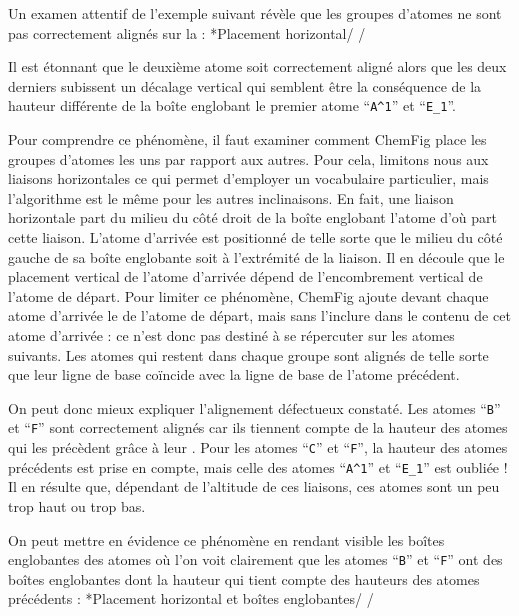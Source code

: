 \documentclass[10pt]{article}
\makeatletter
\newcommand\idx{\@ifstar{\let\print@or@not\@gobble\idx@}{\let\print@or@not\@firstofone\idx@}}
\newcommand\idx@[1]{%
	\ifcat\expandafter\noexpand\@car#1\@nil\relax%
		\expandafter\ifx\@car#1\@nil\protect
			\index{#1}%
			\print@or@not{#1}%
		\else
			\saveexpandmode\expandarg
			\StrSubstitute{\string#1}{\string @}{\@empty\protect\symbol{'100}}[\temp@]%
			\StrGobbleLeft\temp@1[\temp@]%
			\restoreexpandmode
			\expandafter\index\expandafter{\temp@ @\protect\texttt{\protect\textbackslash\temp@}}%
			\print@or@not{\texttt{\string#1}}%
		\fi
	\else
		\index{#1}%
		\print@or@not{#1}%
	\fi
}
\newcommand\make@car@active[1]{%
	\catcode`#1\active
	\begingroup
		\lccode`\~`#1\relax
		\lowercase{\endgroup\def~}%
}
\newif\if@exstar
\newcommand\exemple{%
	\begingroup
	\parskip\z@
	\@makeother\;\@makeother\!\@makeother\?\@makeother\:%
	\@ifstar{\@exstartrue\exemple@}{\@exstarfalse\exemple@}}
\newcommand\exemple@[2][65]{%
	\medbreak\noindent
	\begingroup
		\let\do\@makeother\dospecials
		\make@car@active\ { {}}%
		\make@car@active\^^M{\par\leavevmode}%
		\make@car@active\,{\leavevmode\kern\z@\string,}%
		\make@car@active\-{\leavevmode\kern\z@\string-}%
		\make@car@active\>{\leavevmode\kern\z@\string>}%
		\make@car@active\<{\leavevmode\kern\z@\string<}%
		\exemple@@{#1}{#2}%
}
\newcommand\exemple@@[3]{%
	\def\@tempa##1#3{\exemple@@@{#1}{#2}{##1}}%
	\@tempa
}
\newcommand\exemple@@@[3]{%
	\xdef\the@code{#3}%
	\endgroup
	\if@exstar
		\begingroup
			\fboxrule0.4pt
			\let\breakboxparindent\z@
			\def\bkvz@bottom{\hrule\@height\fboxrule}%
			\let\bkvz@before@breakbox\relax
			\def\bkvz@set@linewidth{\advance\linewidth\dimexpr-2\fboxrule-2\fboxsep}%
			\def\bkvz@left{\vrule\@width\fboxrule\hskip\fboxsep}%
			\def\bkvz@right{\hskip\fboxsep\vrule\@width\fboxrule}%
			\def\bkvz@top{\hbox to \hsize{%
				\vrule\@width\fboxrule\@height\fboxrule
				\leaders\bkvz@bottom\hfill
				\ECFAugie
				\fboxsep\z@
				\colorbox{black}{\kern0.25em\color{white}\footnotesize\lower0.5ex\hbox{\strut#2}\kern0.25em}%
				\leaders\bkvz@bottom\hfill
				\vrule\@width\fboxrule\@height\fboxrule}}%
			\breakbox
				\kern.5ex\relax
				\ttfamily\footnotesize\the@code\par
				\normalfont
				\kern3pt
				\hrule height0.1pt width\linewidth depth0.1pt
				\vskip5pt
				\rightskip0pt plus 1fill
				\everypar{{\color{lightgray}\rlap{\vrule height0.1pt width\linewidth depth0.1pt}}\hskip0pt plus 1fill}%
				\newlinechar`\^^M\everyeof{\noexpand}\scantokens{#3}\par
			\endbreakbox
		\endgroup
	\else
		\vskip0.5ex
		\boxput*(0,1)
			{\fboxsep\z@
			\hbox{\ECFAugie\colorbox{black}{\leavevmode\kern0.25em{\color{white}\footnotesize\strut#2}\kern0.25em}}%
			}%
			{\fboxsep5pt
			\fbox{%
				$\vcenter{\hsize\dimexpr0.#1\linewidth-\fboxsep-\fboxrule\relax
					\kern5pt\parskip0pt \ttfamily\footnotesize\the@code}%
				\vcenter{\kern5pt\hsize\dimexpr\linewidth-0.#1\linewidth-\fboxsep-\fboxrule\relax
					\everypar{{\color{lightgray}\rlap{\vrule height0.1pt width\dimexpr\linewidth-0.#1\linewidth-\fboxsep-\fboxrule depth0.1pt}}}%
					\footnotesize\newlinechar`\^^M\everyeof{\noexpand}\scantokens{#3}}$%
				}%
			}%
	\fi
	\medbreak
	\endgroup
}
\let\do\@makeother\dospecials
\newcommand\CF{{\ECFAugie ChemFig}\xspace}
\makeatother
\begin{document}
Un examen attentif de l'exemple suivant révèle que les groupes d'atomes ne sont pas correctement alignés sur la \idx{ligne de base} :
\exemple*{Placement horizontal}/\Huge\setatomsep{2em}
\qquad
{}/

Il est étonnant que le deuxième atome soit correctement aligné alors que les deux derniers subissent un décalage vertical qui semblent être la conséquence de la hauteur différente de la boîte englobant le premier atome ``\verb-A^1-'' et ``\verb-E_1-''.

Pour comprendre ce phénomène, il faut examiner comment \CF place les groupes d'atomes les uns par rapport aux autres. Pour cela, limitons nous aux liaisons horizontales ce qui permet d'employer un vocabulaire particulier, mais l'algorithme est le même pour les autres inclinaisons. En fait, une liaison horizontale part du milieu du côté droit de la boîte englobant l'atome d'où part cette liaison. L'atome d'arrivée est positionné de telle sorte que le milieu du côté gauche de sa boîte englobante soit à l'extrémité de la liaison. Il en découle que le placement vertical de l'atome d'arrivée dépend de l'encombrement vertical de l'atome de départ. Pour limiter ce phénomène, \CF ajoute devant chaque atome d'arrivée le \idx{\vphantom} de l'atome de départ, mais sans l'inclure dans le contenu de cet atome d'arrivée : ce \idx{\vphantom} n'est donc pas destiné à se répercuter sur les atomes suivants. Les atomes qui restent dans chaque groupe sont alignés de telle sorte que leur ligne de base coïncide avec la ligne de base de l'atome précédent.

On peut donc mieux expliquer l'alignement défectueux constaté. Les atomes ``\verb-B-'' et ``\verb-F-'' sont correctement alignés car ils tiennent compte de la hauteur des atomes qui les précèdent grâce à leur \idx\vphantom. Pour les atomes ``\verb-C-'' et ``\verb-F-'', la hauteur des atomes précédents est prise en compte, mais celle des atomes ``\verb-A^1-'' et ``\verb-E_1-'' est oubliée ! Il en résulte que, dépendant de l'altitude de ces liaisons, ces atomes sont un peu trop haut ou trop bas.

On peut mettre en évidence ce phénomène en rendant visible les boîtes englobantes des atomes où l'on voit clairement que les atomes ``\verb-B-'' et ``\verb-F-'' ont des boîtes englobantes dont la hauteur qui tient compte des hauteurs des atomes précédents :
\exemple*{Placement horizontal et boîtes englobantes}/\Huge\setatomsep{2em}
\fboxsep=0pt
\renewcommand\printatom[1]{\fbox{\ensuremath{\mathrm#1}}}
\qquad
{}/
\end{document}
